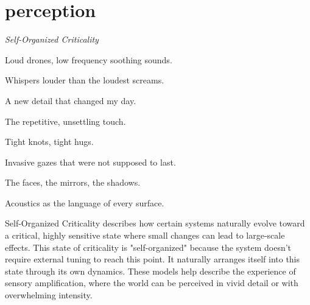 \chapter*{perception}
\begin{center}
\vspace{2cm}
\begin{flushright}
\large
\textit{Self-Organized Criticality}
\end{flushright}
\vspace{2cm}
\end{center}
\normalsize

Loud drones, low frequency soothing sounds.

Whispers louder than the loudest screams. 

A new detail that changed my day. 

The repetitive, unsettling  touch.

Tight knots, tight hugs.

Invasive gazes that were not supposed to last.

The faces, the mirrors, the shadows. 

Acoustics as the language of every surface.


Self-Organized Criticality describes how certain systems naturally evolve toward a critical, highly sensitive state where small changes can lead to large-scale effects. This state of criticality is "self-organized" because the system doesn’t require external tuning to reach this point. It naturally arranges itself into this state through its own dynamics. These models help describe the experience of sensory amplification, where the world can be perceived in vivid detail or with overwhelming intensity. \citep{adami1993}


